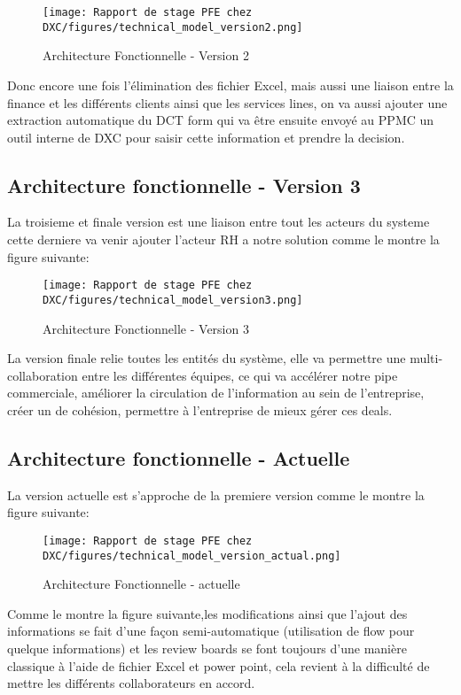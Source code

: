 \begin{figure}[!h]
    \centering
    \texttt{[image: Rapport de stage PFE chez DXC/figures/technical\_model\_version2.png]}
    \caption{Architecture Fonctionnelle - Version 2}
\end{figure}

Donc encore une fois l'élimination des fichier Excel, mais aussi une liaison entre la finance et les différents clients ainsi que les services lines, on va aussi ajouter une extraction automatique du DCT form qui va être ensuite envoyé au PPMC un outil interne de DXC pour saisir cette information et prendre la decision.

\newpage
\subsection{Architecture fonctionnelle - Version 3}
La troisieme et finale version est une liaison entre tout les acteurs du systeme cette derniere va venir ajouter l'acteur RH a notre solution comme le montre la figure suivante:

\begin{figure}[!h]
    \centering
    \texttt{[image: Rapport de stage PFE chez DXC/figures/technical\_model\_version3.png]}
    \caption{Architecture Fonctionnelle - Version 3}
\end{figure}

La version finale relie toutes les entités du système, elle va permettre une multi-collaboration entre les différentes équipes, ce qui va accélérer notre pipe commerciale, améliorer la circulation de l'information au sein de l'entreprise, créer un de cohésion, permettre à l'entreprise de mieux gérer ces deals.

\newpage
\subsection{Architecture fonctionnelle - Actuelle}

La version actuelle est s'approche de la premiere version comme le montre la figure suivante:

\begin{figure}[!h]
    \centering
    \texttt{[image: Rapport de stage PFE chez DXC/figures/technical\_model\_version\_actual.png]}
    \caption{Architecture Fonctionnelle - actuelle}
\end{figure}

Comme le montre la figure suivante,les modifications ainsi que l'ajout des informations se fait d'une façon semi-automatique (utilisation de flow pour quelque informations) et les review boards se font toujours d'une manière classique à l'aide de fichier Excel et power point, cela revient à la difficulté de mettre les différents collaborateurs en accord.

